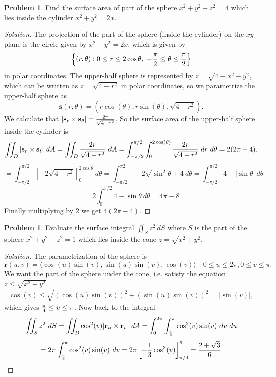\documentclass[12pt]{amsart}%
\theoremstyle{plain}
\theoremstyle{definition}
\newtheorem{prob}[theorem]{Problem}
\theoremstyle{special}
\newcommand{\sol}[1]{
{\begin{proof}[Solution]#1\end{proof}}
}
\newcommand{\Prob}[1]{\begin{tcolorbox}%
\begin{prob}
	#1
\end{prob}
\end{tcolorbox}	
}
\renewcommand{\vec}{\mathbf}
\begin{document}
\Prob{Find the surface area of part of the sphere $x^2+y^2+z^2=4$ which lies inside the cylinder $x^2+y^2=2x$. }

{
\sol{The projection of the part of the sphere (inside the cylinder) on the $xy$-plane is the circle given by $ x^2+y^2=2x$, which is given by
\[\left\{(r,\theta):0\leq r\leq 2\cos \theta,\ -{\pi\over 2}\leq \theta\leq {\pi\over 2}\right\}\]
in polar coordinates.
%
The upper-half sphere is represented by $z=\sqrt{4-x^2-y^2}$, which can be written as $z=\sqrt{4-r^2}$ in polar coordinates, so we parametrize the upper-half sphere as
\[\vec s(r,\theta) =(r\cos(\theta),r\sin(\theta),\sqrt{4-r^2}).\]
We calculate that $|\vec s_r\times \vec s_\theta |={2r\over \sqrt{4-r^2} } $.
So the surface area of the upper-half sphere inside the cylinder is
\[\iint_D|\vec s_r\times \vec s_t|\ d A=\iint_D{2r\over \sqrt{4-r^2}}\ dA=\int_{-\pi/2}^{\pi/2} \int_0^{2\cos(\theta)}{2r\over \sqrt{4-r^2}}\ dr\ d\theta=2(2\pi-4).\]
\[=\int_{-\pi/2}^{\pi/2}\left[-2\sqrt{4-r^2}\right]_0^{2\cos\theta}\ d\theta=\int_{-\pi/2}^{\pi2}-2\sqrt{\sin^2\theta}+4\ d\theta=\int_{-\pi/2}^{\pi/2}4-|\sin\theta|\ d\theta\]
\[=2\int_0^{\pi/2}4-\sin\theta\ d\theta=4\pi-8\]
Finally multiplying by $2$ we get $4(2\pi-4) $.
}
}

\Prob{Evaluate the surface integral $\displaystyle\iint_S z^2\ dS $ where $S$ is the part of the sphere $x^2+y^2+z^2=1$ which lies inside the cone $ z=\sqrt{x^2+y^2}$.}
{
\sol{The parametrization of the sphere is $$\vec r(u,v)=\langle \cos(u)\sin(v),\sin(u)\sin(v),\cos(v)\rangle\quad 0\leq u\leq 2\pi,0\leq v\leq \pi. $$
We want the part of the sphere under the cone, i.e. satisfy the equation $z\leq \sqrt{x^2+y^2}$.
\[\cos(v)\leq\sqrt{(\cos(u)\sin(v))^2+(\sin(u)\sin(v))^2}=|\sin(v)|,\]which gives ${\pi\over 4}\leq v\leq \pi $. Now back to the integral
\[\iint_S z^2\ dS=\iint_D \cos^2(v)|\vec r_u\times \vec r_v |\ d A=
\int_0^{2\pi} \int_{\pi\over 4}^{\pi}\cos^2(v)\sin(v)\ dv\ du\]
\[=2\pi \int_{\pi\over 4}^\pi\cos^2(v)\sin(v)\ dv=2\pi\left[ -{1\over 3}\cos^3(v)\right]_{\pi/4}^\pi ={2+\sqrt{3}\over 6}\qedhere\]
}
}


\newpage
\end{document}
